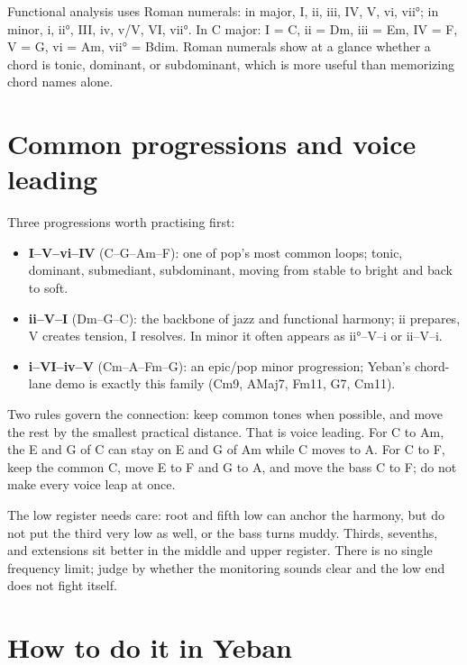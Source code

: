 Functional analysis uses Roman numerals: in major, I, ii, iii, IV, V, vi, vii°; in minor, i, ii°, III, iv, v/V, VI, vii°. In C major: I = C, ii = Dm, iii = Em, IV = F, V = G, vi = Am, vii° = Bdim. Roman numerals show at a glance whether a chord is tonic, dominant, or subdominant, which is more useful than memorizing chord names alone.

\section{Common progressions and voice leading}

Three progressions worth practising first:

\begin{itemize}
  \item \textbf{I–V–vi–IV} (C–G–Am–F): one of pop's most common loops; tonic, dominant, submediant, subdominant, moving from stable to bright and back to soft.
  \item \textbf{ii–V–I} (Dm–G–C): the backbone of jazz and functional harmony; ii prepares, V creates tension, I resolves. In minor it often appears as ii°–V–i or ii–V–i.
  \item \textbf{i–VI–iv–V} (Cm–A\flatsym–Fm–G): an epic/pop minor progression; Yeban's chord-lane demo is exactly this family (Cm9, A\flatsym Maj7, Fm11, G7, Cm11).
\end{itemize}

Two rules govern the connection: keep common tones when possible, and move the rest by the smallest practical distance. That is voice leading. For C to Am, the E and G of C can stay on E and G of Am while C moves to A. For C to F, keep the common C, move E to F and G to A, and move the bass C to F; do not make every voice leap at once.

The low register needs care: root and fifth low can anchor the harmony, but do not put the third very low as well, or the bass turns muddy. Thirds, sevenths, and extensions sit better in the middle and upper register. There is no single frequency limit; judge by whether the monitoring sounds clear and the low end does not fight itself.

\section{How to do it in Yeban}

